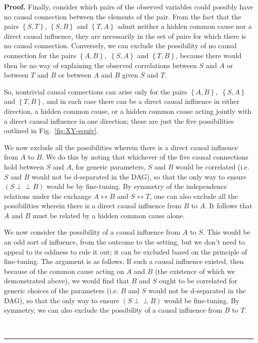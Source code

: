 \documentclass[letterpaper,onecolumn,nofootinbib]{revtex4}
\newenvironment{proof}[1][Proof]{\noindent\textbf{#1.} }{\ \rule{0.5em}{0.5em}}
\def\indep{\perp\!\!\!\!\perp}
\begin{document}
\begin{proof}
Finally, consider which pairs of the observed variables could possibly have no causal connection between the elements of the pair. From the fact that the pairs $\left\{S,T\right\}$, $\left\{S,B\right\}$ and $\left\{T,A\right\}$ admit neither a hidden common cause nor a direct causal influence, they are necessarily in the set of pairs for which there is no causal connection.   Conversely, we can exclude the possibility of no causal connection for the pairs $\left\{A,B\right\},$ $\left\{  S,A\right\}  $ and $\left\{  T,B\right\}$, because there would then be no way of explaining the observed correlations between $S$ and $A$ or between $T$ and $B$ or between $A$ and $B$ given $S$ and $T.$

So, nontrivial causal connections can arise only for the pairs $\left\{A,B\right\},$ $\left\{  S,A\right\}  $ and $\left\{  T,B\right\}$, and in each case there can be a direct causal influence in either direction, a hidden common cause, or a hidden common cause acting jointly with a direct causal influence in one direction; these are just the five possibilities outlined in Fig.~\ref{fig:XY-equiv}.

We now exclude all the possibilities wherein there is a direct causal influence from $A$ to $B$.  We do this by noting that whichever of the five causal connections hold between $S$ and $A$, for generic parameters, $S$ and $B$ would be correlated (i.e. $S$ and $B$ would not be d-separated in the DAG), so that the only way to ensure $\left(S \indep B\right)$ would be by fine-tuning.  By symmetry of the independence relations under the exchange $A \leftrightarrow B$ and $S \leftrightarrow T$, one can also exclude all the possibilities wherein there is a direct causal influence from $B$ to $A$.  It follows that $A$ and $B$ must be related by a hidden common cause alone. 

We now consider the possibility of a causal influence from $A$ to $S$.  This would be an odd sort of influence, from the outcome to the setting, but we don't need to appeal to its oddness to rule it out; it can be excluded based on the principle of fine-tuning. The argument is as follows.  If such a causal influence existed, then because of the common cause acting on $A$ and $B$ (the existence of which we demonstrated above), we would find that $B$ and $S$ ought to be correlated for generic choices of the parameters (i.e. $B$ and $S$ would not be d-separated in the DAG), so that the only way to ensure $\left(S \indep B\right)$ would be fine-tuning.  By symmetry, we can also exclude the possibility of a causal influence from $B$ to $T$. 


\end{proof}
\end{document}

